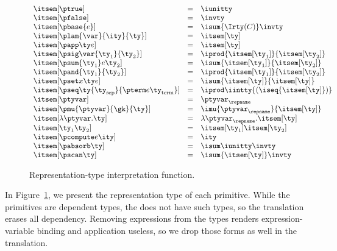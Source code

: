 \begin{figure}
\fbox{$\itsem[\ty] = \ity$}
\[
\begin{array}{lcl} 
\itsem[\ptrue] & = & \iunitty \\
\itsem[\pfalse] & = & \invty \\
\itsem[\pbase{e}] & = & \isum {\Irty(C)} \invty   \\
\itsem[\plam{\var}{\ity}{\ty}] & = & \itsem[\ty] \\
\itsem[\papp \ty e] & = & \itsem[\ty] \\
\itsem[\psig \var {\ty_1} {\ty_2}]  & = & \iprod {\itsem[\ty_1]} {\itsem[\ty_2]}    \\
\itsem[\psum {\ty_1} e {\ty_2}]     & = & \isum {\itsem[\ty_1]} {\itsem[\ty_2]} \\
\itsem[\pand {\ty_1} {\ty_2}]  & = & \iprod {\itsem[\ty_1]}{\itsem[\ty_2]}\\
\itsem[\pset x \ty e] & = & \isum {\itsem[\ty]}{\itsem[\ty]}\\
\itsem[\pseq \ty {\ty_{\text{sep}}} {\pterm e {\ty_{\text{term}}}}] & = & 
    \iprod \iintty {(\iseq{\itsem[\ty]})}             \\
\itsem[\ptyvar] & = & \ptyvar_\repname \\
\itsem[\pmu{\ptyvar}{\gk}{\ty}] & = & \imu{\ptyvar_\repname}{\itsem[\ty]} \\
\itsem[\lambda \ptyvar.\ty]       & = & \lambda \ptyvar_\repname.\itsem[\ty] \\
\itsem[\ty_1 \ty_2]              & = & \itsem[\ty_1] \itsem[\ty_2] \\
\itsem[\pcompute e \ity]                 & = & \ity \\
\itsem[\pabsorb \ty]                     & = & \isum \iunitty \invty \\
\itsem[\pscan \ty] & = & \isum {\itsem[\ty]} \invty
\end{array}
\]
\caption{Representation-type interpretation function.}
\label{fig:rep-tys}
\end{figure}

In Figure~\ref{fig:rep-tys}, we present the representation type of
each \ddc{} primitive. While the primitives are dependent types, the
\implang{} does not have such types, so the translation erases all
dependency. Removing expressions from the types renders expression-variable
binding and application useless, so we drop those forms as well in the translation.

